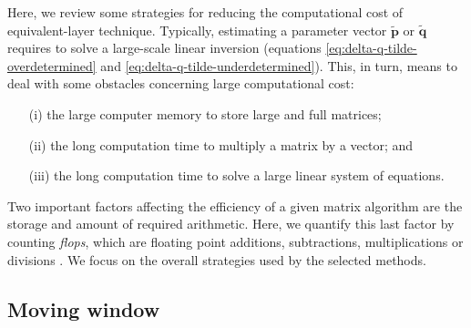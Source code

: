 Here, we review some strategies for reducing the computational cost of equivalent-layer technique.
Typically, estimating a parameter vector $\tilde{\mathbf{p}}$ or $\tilde{\mathbf{q}}$ 
requires to solve a large-scale linear inversion (equations \ref{eq:delta-q-tilde-overdetermined} and \ref{eq:delta-q-tilde-underdetermined}).
This, in turn, means to deal with some obstacles concerning large computational cost:
\begin{itemize}
	\item[(i)] the large computer memory to store large and full matrices;
	\item[(ii)] the long computation time to multiply a matrix by a vector; and
	\item[(iii)] the long computation time to solve a large linear system of equations.
\end{itemize}
Two important factors affecting the efficiency of a given matrix algorithm are the 
storage and amount of required arithmetic. Here, we quantify this last factor by counting \textit{flops},
which are floating point additions, subtractions, multiplications or divisions \cite[][ p. 12--14]{golub-vanloan2013}.
We focus on the overall strategies used by the selected methods.

\subsection{Moving window}

